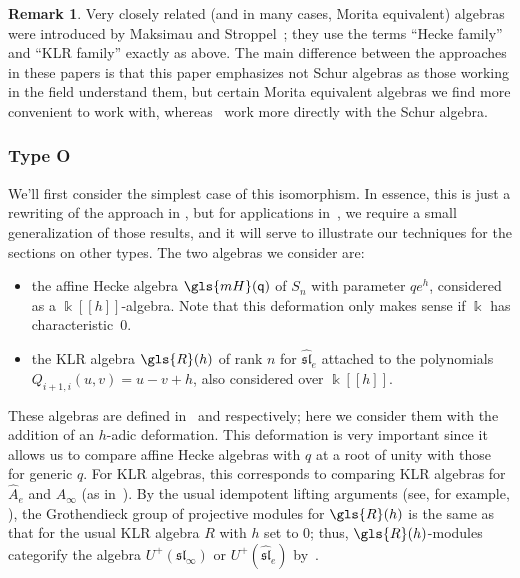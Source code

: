 \documentclass[10pt]{article}
\theoremstyle{definition}
\newtheorem{rema}[theorem]{Remark}
\newcommand{\pq}{\mathsf{q}}
\newcommand{\slehat}{\mathfrak{\widehat{sl}}_e}
\newcommand{\K}{\Bbbk}%
\newcommand\llbracket{[\![}
\newcommand\rrbracket{]\!]}
\begin{document}
\begin{rema}
 Very closely related (and in many cases, Morita equivalent) algebras
 were introduced by Maksimau and Stroppel~\cite{MS18}; they use the
 terms ``Hecke family'' and ``KLR family'' exactly as above. The
 main difference between the approaches in these papers is that this
 paper emphasizes not Schur algebras as those working in the field
 understand them, but certain Morita equivalent algebras we find more
 convenient to work with, whereas~\cite{MS18} work more directly
 with the Schur algebra. 
\end{rema}

\subsubsection*{Type O} We'll first consider the simplest case of
this isomorphism. In essence, this is just a rewriting of the
approach in 
\cite[\S~3.2]{Rou2KM}, but for applications in~\cite{WebRou}, we require
a small generalization of those results, and it will serve to
illustrate our techniques for the sections on other types. The two algebras we consider are:
\begin{itemize}
\item the affine Hecke algebra $\gls{mH}(\pq)$ of
$S_n$ with parameter $qe^h$, considered as a $\K\llbracket h\rrbracket$-algebra. Note
that this deformation only makes sense if $\K$ has characteristic~0.
\item the KLR algebra $\gls{R}(h)$ of rank $n$ for
$\slehat$ attached to the polynomials $Q_{i+1,i}(u,v)=u-v+h$, also
considered over $\K\llbracket h\rrbracket$.
\end{itemize}
These algebras are defined in~\cite[(4.1--5)]{BKKL} and
\cite[(1.6--15)]{BKKL} respectively; here we consider them with
the addition of an $h$-adic deformation. This deformation is very
important since it allows us to compare affine Hecke algebras with $q$
at a root of unity with those for generic $q$. 
For KLR algebras, this
corresponds to comparing KLR algebras for $\widehat{A}_e$ and
$A_\infty$ (as in~\cite[Ex.~2.25]{WebwKLR}).
By the usual idempotent lifting arguments (see, for example,
\cite[Lem.~2.2]{Kbook}), the Grothendieck group of
projective modules for $\gls{R}(h)$ is the same as that for the usual KLR
algebra $R$ with $h$ set to $0$; thus, $\gls{R}(h)$-modules categorify the
algebra $U^+(\mathfrak{sl}_\infty)$ or
$U^+(\mathfrak{\widehat{sl}}_e)$ by~\cite[Thm.~8]{KLII}.
\end{document}
